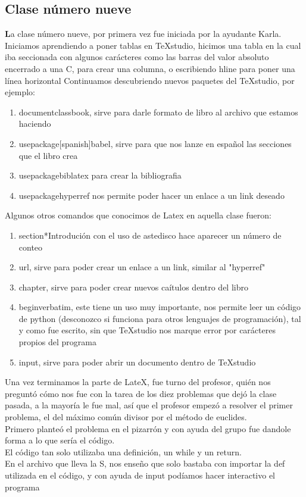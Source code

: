 \documentclass{book}
\begin{document}
\begin{enumerate}
\begin{enumerate}
\chapter{Clase número nueve}
\textbf La clase número nueve, por primera vez fue iniciada por la ayudante Karla. Iniciamos aprendiendo a poner tablas en TeXstudio, hicimos una tabla en la cual iba seccionada con algunos carácteres como las barras del valor absoluto encerrado a una C, para crear una columna, o escribiendo hline para poner una línea horizontal
Continuamos descubriendo nuevos paquetes del TeXstudio, por ejemplo:
\begin{enumerate}
	\item documentclass{book}, sirve para darle formato de libro al archivo que estamos haciendo
	\item usepackage[spanish]{babel}, sirve para que nos lanze en español las secciones que el libro crea
	\item usepackage{biblatex} para crear la bibliografia
	\item usepackage{hyperref} nos permite poder hacer un enlace a un link deseado
\end{enumerate}
Algunos otros comandos que conocimos de Latex en aquella clase fueron: 
\begin{enumerate}
	\item section*{Introdución} con el uso de astedisco hace aparecer un número de conteo
	\item url, sirve para poder crear un enlace a un link, similar al "hyperref"
	\item chapter, sirve para poder crear nuevos caítulos dentro del libro
	\item begin{verbatim}, este tiene un uso muy importante, nos permite leer un código de python (desconozco si funciona para otros lenguajes de programación), tal y como fue escrito, sin que TeXstudio nos marque error por carácteres propios del programa
	\item input, sirve para poder abrir un documento dentro de TeXstudio
\end{enumerate}
Una vez terminamos la parte de LateX, fue turno del profesor, quién nos preguntó cómo nos fue con la tarea de los diez problemas que dejó la clase pasada, a la mayoría le fue mal, así que el profesor empezó a resolver el primer problema, el del máximo común divisor por el método de euclides.\\
Primero planteó el problema en el pizarrón y con ayuda del grupo fue dandole forma a lo que sería el código. \\
El código tan solo utilizaba una definición, un while y un return.\\
En el archivo que lleva la S, nos enseño que solo bastaba con importar la def utilizada en el código, y con ayuda de input podíamos hacer interactivo el programa\\


\end{enumerate}
\end{enumerate}
\end{document}
